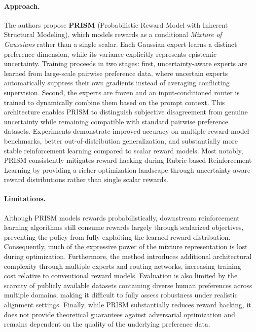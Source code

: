 \documentclass[11pt]{article}
\begin{document}
\paragraph{Approach.}
The authors propose \textbf{PRISM} (Probabilistic Reward Model with Inherent Structural Modeling), which models rewards as a conditional \emph{Mixture of Gaussians} rather than a single scalar. Each Gaussian expert learns a distinct preference dimension, while its variance explicitly represents epistemic uncertainty. Training proceeds in two stages: first, uncertainty-aware experts are learned from large-scale pairwise preference data, where uncertain experts automatically suppress their own gradients instead of averaging conflicting supervision. Second, the experts are frozen and an input-conditioned router is trained to dynamically combine them based on the prompt context. This architecture enables PRISM to distinguish subjective disagreement from genuine uncertainty while remaining compatible with standard pairwise preference datasets. Experiments demonstrate improved accuracy on multiple reward-model benchmarks, better out-of-distribution generalization, and substantially more stable reinforcement learning compared to scalar reward models. Most notably, PRISM consistently mitigates reward hacking during Rubric-based Reinforcement Learning by providing a richer optimization landscape through uncertainty-aware reward distributions rather than single scalar rewards.  

\paragraph{Limitations.}
Although PRISM models rewards probabilistically, downstream reinforcement learning algorithms still consume rewards largely through scalarized objectives, preventing the policy from fully exploiting the learned reward distribution. Consequently, much of the expressive power of the mixture representation is lost during optimization. Furthermore, the method introduces additional architectural complexity through multiple experts and routing networks, increasing training cost relative to conventional reward models. Evaluation is also limited by the scarcity of publicly available datasets containing diverse human preferences across multiple domains, making it difficult to fully assess robustness under realistic alignment settings. Finally, while PRISM substantially reduces reward hacking, it does not provide theoretical guarantees against adversarial optimization and remains dependent on the quality of the underlying preference data.  
\end{document}

